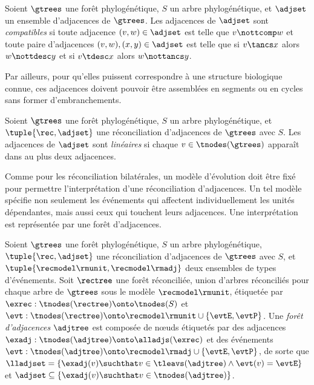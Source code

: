 \begin{definition}[Compatibilité]\label{definition:adjrec-adj-compat}
    Soient \(\gtrees\) une forêt phylogénétique, \(S\) un arbre phylogénétique, et \(\adjset\) un ensemble d’adjacences de \(\gtrees\).
    Les adjacences de \(\adjset\) sont \emph{compatibles} si
        toute adjacence \((v, w) \in \adjset\) est telle que \(v \nottcomp w\) et
        toute paire d’adjacences \((v, w), (x, y) \in \adjset\) est telle que
            si \(v \tancs x\) alors \(w \nottdesc y\) et
            si \(v \tdesc x\) alors \(w \nottancs y\).
\end{definition}

Par ailleurs, pour qu’elles puissent correspondre à une structure biologique connue, ces adjacences doivent pouvoir être assemblées en segments ou en cycles sans former d’embranchements.

\begin{definition}[Linéarité]\label{definition:adjrec-lin}
    Soient \(\gtrees\) une forêt phylogénétique, \(S\) un arbre phylogénétique, et \(\tuple{\rec, \adjset}\) une réconciliation d’adjacences de \(\gtrees\) avec \(S\).
    Les adjacences de \(\adjset\) sont \emph{linéaires} si chaque \(v \in \tnodes(\gtrees)\) apparaît dans au plus deux adjacences.
\end{definition}

Comme pour les réconciliation bilatérales, un modèle d’évolution doit être fixé pour permettre l’interprétation d’une réconciliation d’adjacences.
Un tel modèle spécifie non seulement les événements qui affectent individuellement les unités dépendantes, mais aussi ceux qui touchent leurs adjacences.
Une interprétation est représentée par une forêt d’adjacences.

\begin{definition}\label{definition:adjrectree}
    Soient \(\gtrees\) une forêt phylogénétique, \(S\) un arbre phylogénétique, \(\tuple{\rec, \adjset}\) une réconciliation d’adjacences de \(\gtrees\) avec \(S\), et \(\tuple{\recmodel\rmunit, \recmodel\rmadj}\) deux ensembles de types d’événements.
    Soit \(\rectree\) une forêt réconciliée, union d’arbres réconciliés
        pour chaque arbre de \(\gtrees\) sous le modèle \(\recmodel\rmunit\),
        étiquetée par \(\exrec : \tnodes(\rectree) \onto \tnodes(S)\)
        et \(\evt : \tnodes(\rectree) \onto \recmodel\rmunit \cup \{\evtE, \evtP\}\).
    Une \emph{forêt d’adjacences} \(\adjtree\) est composée de nœuds
        étiquetés par des adjacences
        \(\exadj : \tnodes(\adjtree) \onto \alladjs(\exrec)\)
        et des événements
        \(\evt : \tnodes(\adjtree) \onto \recmodel\rmadj \cup \{\evtE, \evtP\}\),
        de sorte que \(\lladjset = \{\exadj(v) \suchthat v \in \tleavs(\adjtree) \land \evt(v) = \evtE\}\)
        et \(\adjset \subseteq \{\exadj(v) \suchthat v \in \tnodes(\adjtree)\}\).
\end{definition}

